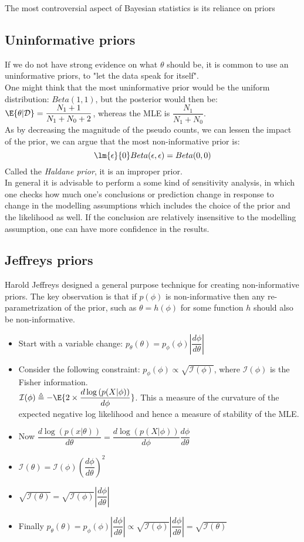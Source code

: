 The most controversial aspect of Bayesian statistics is its reliance on priors
\subsection{Uninformative priors}
If we do not have strong evidence on what $\theta$ should be, it is common to use an
uninformative priors, to "let the data speak for itself".\\
One might think that the most uninformative prior would be the uniform distribution: 
$Beta(1, 1)$, but the posterior would then be: $\E{\theta|\mathcal{D}} =
\dfrac{N_{1}+1}{N_{1}+N_{0}+2}$, whereas the MLE is $\dfrac{N_{1}}{N_{1}+N_{0}}$.\\
As by decreasing the magnitude of the pseudo counts, we can lessen the impact of the 
prior, we can argue that the most non-informative prior is: 
$$\lm{\epsilon}{0} Beta(\epsilon, \epsilon) = Beta(0, 0)$$
Called the \emph{Haldane prior}, it is an improper prior.\\
In general it is advisable to perform a some kind of sensitivity analysis, in which one
checks how much one's conclusions or prediction change in response to change in the 
modelling assumptions which includes the choice of the prior and the likelihood as well.
If the conclusion are relatively insensitive to the modelling assumption, one can have
more confidence in the results.
\subsection{Jeffreys priors}
Harold Jeffreys designed a general purpose technique for creating non-informative priors.
The key observation is that if $p(\phi)$ is non-informative then any re-parametrization
of the prior, such as $\theta=h(\phi)$ for some function $h$ should also be 
non-informative.
\begin{itemize}
	\item Start with a variable change: $p_{\theta}(\theta) = p_{\phi}(\phi)\left|\dfrac{d\phi}{d\theta}\right|$
	\item Consider the following constraint: $p_{\phi}(\phi)\propto
		\sqrt{\mathcal{I}(\phi)}$, where $\mathcal{I}(\phi)$ is the Fisher 
		information.\\ $\mathcal{I}(\phi) \triangleq - \E{2 \times 
		\dfrac{d\log\left(p(X|\phi)\right)}{d\phi}}$. This a measure of the
		curvature of the expected negative log likelihood and hence a measure of
		stability of the MLE.
	\item Now $\dfrac{d\log(p(x|\theta))}{d\theta} = 
		\dfrac{d\log(p(X|\phi))}{d\phi}\dfrac{d\phi}{d\theta}$
	\item $\mathcal{I}(\theta) = \mathcal{I}(\phi)
		\left(\dfrac{d\phi}{d\theta}\right)^{2}$
	\item $\sqrt{\mathcal{I}(\theta)} = \sqrt{\mathcal{I}(\phi)}\left|\dfrac{d\phi}
		{d\theta}\right|$
	\item Finally $p_{\theta}(\theta) = p_{\phi}(\phi)\left|\dfrac{d\phi}
		{d\theta}\right| \propto \sqrt{\mathcal{I}(\phi)}\left|\dfrac{d\phi}
		{d\theta}\right| = \sqrt{\mathcal{I}(\theta)}$
\end{itemize}

